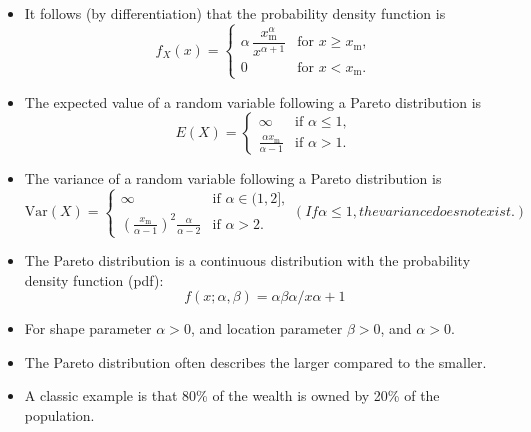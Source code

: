 \documentclass[]{report}
\begin{document}
{
\begin{itemize}

\item It follows (by differentiation) that the probability density function is
\[
f_X(x)= \begin{cases} \alpha\,\dfrac{x_\mathrm{m}^\alpha}{x^{\alpha+1}} & \mbox{for }x \ge x_\mathrm{m}, \\[12pt] 0 & \mbox{for } x < x_\mathrm{m}. \end{cases} 
\]

\item The expected value of a random variable following a Pareto distribution is
\[
E(X)= \begin{cases} \infty & \mbox{if }\alpha\le 1, \\ \frac{\alpha x_\mathrm{m}}{\alpha-1} & \mbox{if }\alpha>1. \end{cases}
\]


\item The variance of a random variable following a Pareto distribution is
\[
\mathrm{Var}(X)= \begin{cases} \infty & \mbox{if }\alpha\in(1,2], \\ \left(\frac{x_\mathrm{m}}{\alpha-1}\right)^2 \frac{\alpha}{\alpha-2} & \mbox{if }\alpha>2. \end{cases}
(If \alpha\le 1, the variance does not exist.)
\]



\item The Pareto distribution is 
a continuous distribution with the probability density function (pdf):
\[
f(x; \alpha, \beta) = \alpha\beta\alpha / x\alpha+ 1
\]
\item For shape parameter $\alpha > 0$, and location parameter $\beta > 0$, and $\alpha > 0$.
\end{itemize}

\begin{itemize}
\item The Pareto distribution often 
describes the larger compared
to the smaller. 
\item A classic example is that 
80\% of the wealth is owned by 20\% of the population.


\end{itemize}}
\end{document}
